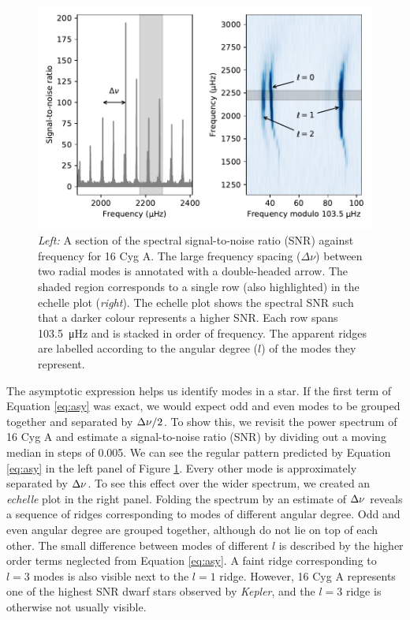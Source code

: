 \begin{figure}[tb]
    \centering
    \includegraphics{figures/seismo-echelle.pdf}
    \caption[Signal-to-noise ratio as a function of frequency and echelle diagram for 16 Cyg A.]{\emph{Left:} A section of the spectral signal-to-noise ratio (SNR) against frequency for 16 Cyg A. The large frequency spacing (\(\Delta\nu\)) between two radial modes is annotated with a double-headed arrow. The shaded region corresponds to a single row (also highlighted) in the echelle plot (\emph{right}). The echelle plot shows the spectral SNR such that a darker colour represents a higher SNR. Each row spans \SI{103.5}{\micro\hertz} and is stacked in order of frequency. The apparent ridges are labelled according to the angular degree (\(l\)) of the modes they represent.}
    \label{fig:seismo-echelle}
\end{figure}

The asymptotic expression helps us identify modes in a star. If the first term of Equation \ref{eq:asy} was exact, we would expect odd and even modes to be grouped together and separated by \({\Delta\nu}/2\). To show this, we revisit the power spectrum of 16 Cyg A and estimate a signal-to-noise ratio (SNR) by dividing out a moving median in steps of \SI{0.005}{\dex}. We can see the regular pattern predicted by Equation \ref{eq:asy} in the left panel of Figure \ref{fig:seismo-echelle}. Every other mode is approximately separated by \({\Delta\nu}\). To see this effect over the wider spectrum, we created an \emph{echelle} plot in the right panel. Folding the spectrum by an estimate of \({\Delta\nu}\) reveals a sequence of ridges corresponding to modes of different angular degree. Odd and even angular degree are grouped together, although do not lie on top of each other. The small difference between modes of different \(l\) is described by the higher order terms neglected from Equation \ref{eq:asy}. A faint ridge corresponding to \(l=3\) modes is also visible next to the \(l=1\) ridge. However, 16 Cyg A represents one of the highest SNR dwarf stars observed by \emph{Kepler}, and the \(l=3\) ridge is otherwise not usually visible. 

